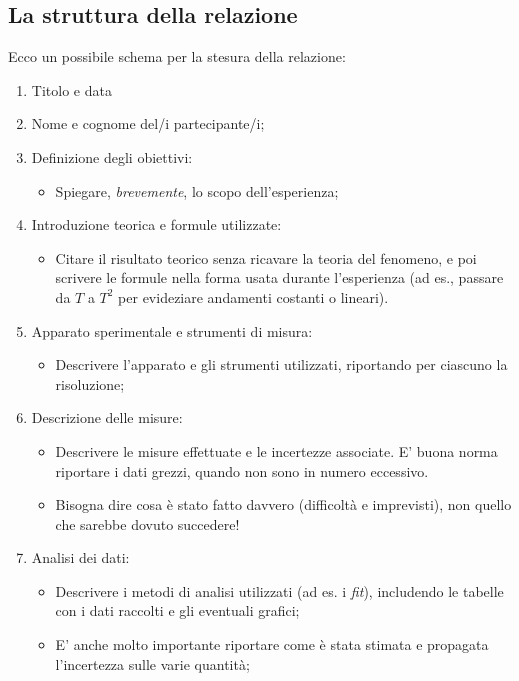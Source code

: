 \documentclass{lab1-article}
\begin{document}
\begin{article}
\section{La struttura della relazione}
Ecco un possibile schema per la stesura della relazione:
\begin{enumerate}[label={\alph*)}]
\item Titolo e data
\item Nome e cognome del/i partecipante/i;
\item Definizione degli obiettivi:
\begin{itemize}
 \item Spiegare, \emph{brevemente}, lo scopo dell'esperienza;
\end{itemize}
\item Introduzione teorica e formule utilizzate:
\begin{itemize}
 \item Citare il risultato teorico senza ricavare la teoria del fenomeno, e poi scrivere le formule nella forma usata durante l'esperienza (ad es., passare da $T$ a $T^{2}$ per evideziare andamenti costanti o lineari).
\end{itemize}
\item Apparato sperimentale e strumenti di misura:
\begin{itemize}
 \item Descrivere l'apparato e gli strumenti utilizzati, riportando per ciascuno la risoluzione;
\end{itemize}
\item Descrizione delle misure:
\begin{itemize}
 \item Descrivere le misure effettuate e le incertezze associate. E' buona norma riportare i dati grezzi, quando non sono in numero eccessivo.
 \item Bisogna dire cosa \`e stato fatto davvero (difficolt\`a e imprevisti), non quello che sarebbe dovuto succedere!
\end{itemize}
\item Analisi dei dati:
\begin{itemize}
 \item Descrivere i metodi di analisi utilizzati (ad es. i \emph{fit}), includendo le tabelle con i dati raccolti e gli
eventuali grafici;
 \item E' anche molto importante riportare come \`e stata stimata e propagata l'incertezza sulle varie quantit\`a;

\end{itemize}
\end{enumerate}
\end{article}
\end{document}
